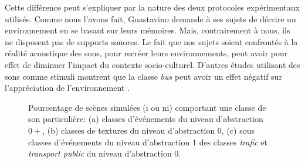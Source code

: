 Cette différence peut s'expliquer par la nature des deux protocoles expérimentaux utilisés. Comme nous l'avons fait, Guastavino demande à ses sujets de décrire un environnement en se basant sur leurs mémoires. Mais, contrairement à nous, ils ne disposent pas de supports sonores. Le fait que nos sujets soient confrontés à la réalité acoustique des sons, pour recréer leurs environnements, peut avoir pour effet de diminuer l'impact du contexte socio-culturel. D'autres études utilisant des sons comme stimuli montrent que la classe \emph{bus} peut avoir un effet négatif sur l'appréciation de l'environnement \citep{lavandier2006contribution}.

\begin{figure}[t]
        \myfloatalign
         \par
       \caption[Pourcentage de scènes simulées comportant une classe de son particulière.]{Pourcentage de scènes simulées (i ou ni) comportant une classe de son particulière: (a) classes d'événements du niveau d'abstraction $0+$, (b) classes de textures du niveau d'abstraction $0$, (c) sous classes d'événements du niveau d'abstraction 1 des classes \emph{trafic} et \emph{transport public} du niveau d'abstraction 0.}\label{fig:soundsource}
\end{figure}

